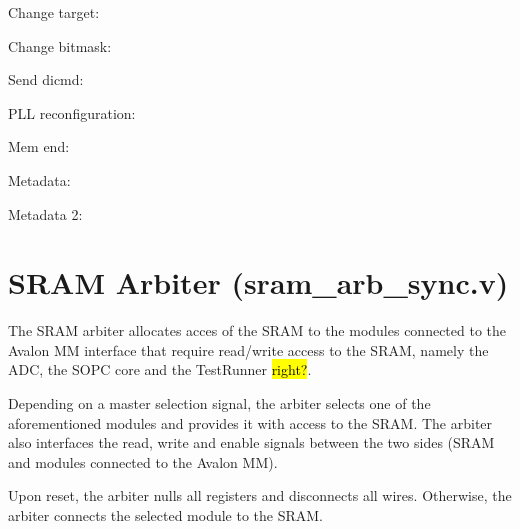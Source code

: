 Change target:





Change bitmask:




Send dicmd:




PLL reconfiguration:



Mem end:




Metadata:




Metadata 2:


\section{SRAM Arbiter (sram\_arb\_sync.v)}

The SRAM arbiter allocates acces of the SRAM to the modules connected to the Avalon MM interface that require read/write access to the SRAM, namely the ADC, the SOPC core and the TestRunner \hl{right?}.

Depending on a master selection signal, the arbiter selects one of the aforementioned modules and provides it with access to the SRAM. The arbiter also interfaces the read, write and enable signals between the two sides (SRAM and modules connected to the Avalon MM).

Upon reset, the arbiter nulls all registers and disconnects all wires. Otherwise, the arbiter connects the selected module to the SRAM.
